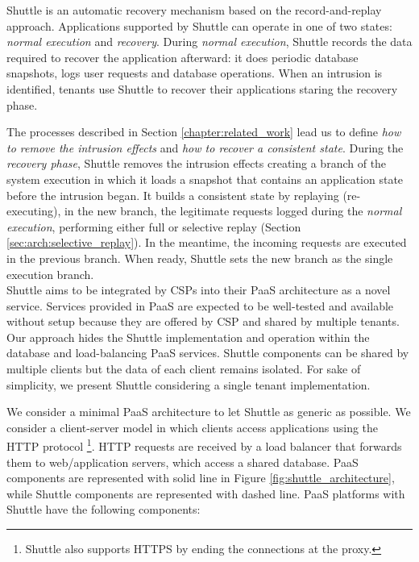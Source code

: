 Shuttle is an automatic recovery mechanism based on the record-and-replay approach. Applications supported by Shuttle can operate in one of two states: \textit{normal execution} and \textit{recovery}. During \emph{normal execution}, Shuttle records the data required to recover the application afterward: it does periodic database snapshots, logs user requests and database operations. When an intrusion is identified, tenants use Shuttle to recover their applications staring the recovery phase.

The processes described in Section \ref{chapter:related_work} lead us to define \textit{how to remove the intrusion effects} and \textit{how to recover a consistent state}. During the \emph{recovery phase}, Shuttle removes the intrusion effects creating a branch of the system execution in which it loads a snapshot that contains an application state before the intrusion began. It builds a consistent state by replaying (re-executing), in the new branch, the legitimate requests logged during the \emph{normal execution}, performing either full or selective replay (Section \ref{sec:arch:selective_replay}). In the meantime, the incoming requests are executed in the previous branch. When ready, Shuttle sets the new branch as the single execution branch. \\



Shuttle aims to be integrated by CSPs into their \ac{PaaS} architecture as a novel service. Services provided in \ac{PaaS} are expected to be well-tested and available without setup because they are offered by \ac{CSP} and shared by multiple tenants. Our approach hides the Shuttle implementation and operation within the database and load-balancing \ac{PaaS} services. Shuttle components can be shared by multiple clients but the data of each client remains isolated. For sake of simplicity, we present Shuttle considering a single tenant implementation.

We consider a minimal \ac{PaaS} architecture to let Shuttle as generic as possible. We consider a client-server model in which clients access applications using the \ac{HTTP} protocol \footnote{Shuttle also supports HTTPS by ending the connections at the proxy.}. \ac{HTTP} requests are received by a load balancer that forwards them to web/application servers, which access a shared database. {PaaS} components are represented with solid line in Figure \ref{fig:shuttle_architecture}, while Shuttle components are represented with dashed line. \ac{PaaS} platforms with Shuttle have the following components:

